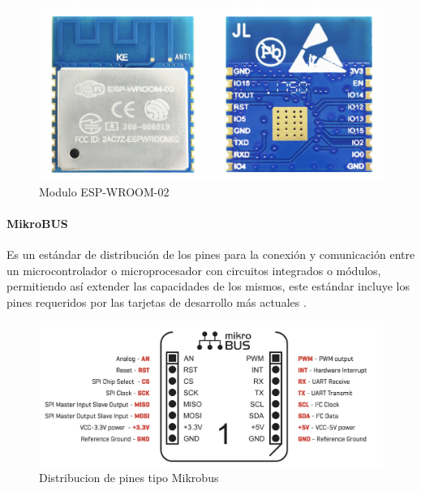 \paragraph{}

\begin{figure}[H]
	\centering
	\includegraphics[scale=.25]{Capitulo2/images/wroom.png}
	\caption{Modulo ESP-WROOM-02}
	\label{fig:diagrama_dispensador}
\end{figure}


\paragraph{MikroBUS}
Es un estándar de distribución de los pines para la conexión y comunicación entre un microcontrolador o microprocesador con circuitos integrados o módulos, permitiendo así extender las capacidades de los mismos, este estándar incluye los pines requeridos por las tarjetas de desarrollo más actuales \citep{MarcoTeorico5}.
\begin{figure}[H]
	\centering
	\includegraphics[scale=.25]{Capitulo2/images/mikrobus.png}
	\caption{Distribucion de pines tipo Mikrobus}
	\label{fig:diagrama_dispensador}
\end{figure}
\paragraph{}

